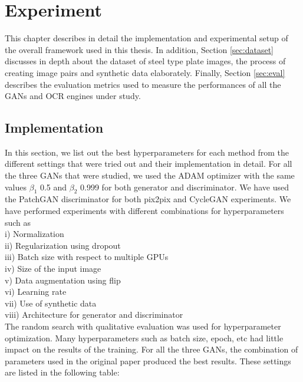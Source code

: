 \chapter{Experiment}\label{ch:exp}
	This chapter describes in detail the implementation and experimental setup of the overall framework used in this thesis. In addition, Section \ref{sec:dataset} discusses in depth about the dataset of steel type plate images, the process of creating image pairs and synthetic data elaborately. Finally, Section \ref{sec:eval} describes the evaluation metrics used to measure the performances of all the GANs and OCR engines under study.

\section{Implementation}\label{sec:imp}
In this section, we list out the best hyperparameters for each method from the different settings that were tried out and their implementation in detail. For all the three GANs that were studied, we used the ADAM optimizer with the same values $\beta_1$ 0.5 and $\beta_2$ 0.999 for both generator and discriminator. We have used the PatchGAN discriminator for both pix2pix and CycleGAN experiments. We have performed experiments with different combinations for hyperparameters such as\\
i) Normalization \\
ii) Regularization using dropout \\
iii) Batch size with respect to multiple GPUs \\
iv) Size of the input image\\
v) Data augmentation using flip\\
vi) Learning rate\\
vii) Use of synthetic data\\
viii) Architecture for generator and discriminator\\

	The random search with qualitative evaluation was used for hyperparameter optimization. Many hyperparameters such as batch size, epoch, etc had little impact on the results of the training. For all the three GANs, the combination of parameters used in the original paper produced the best results. These settings are listed in the following table:

